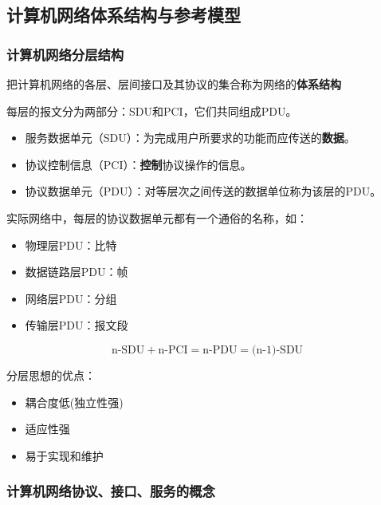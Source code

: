 \documentclass[12pt, a4paper, oneside]{ctexart}
\begin{document}
\subsection{计算机网络体系结构与参考模型}

\subsubsection{计算机网络分层结构}

把计算机网络的各层、层间接口及其协议的集合称为网络的\textbf{体系结构}

每层的报文分为两部分：SDU和PCI，它们共同组成PDU。
\begin{itemize}
    \item 服务数据单元（SDU）：为完成用户所要求的功能而应传送的\textbf{数据}。
    \item 协议控制信息（PCI）：\textbf{控制}协议操作的信息。
    \item 协议数据单元（PDU）：对等层次之间传送的数据单位称为该层的PDU。
\end{itemize}
实际网络中，每层的协议数据单元都有一个通俗的名称，如：
\begin{itemize}
    \item 物理层PDU：比特
    \item 数据链路层PDU：帧
    \item 网络层PDU：分组
    \item 传输层PDU：报文段
\end{itemize}
\begin{equation*}
    \text{n-SDU}+\text{n-PCI}=\text{n-PDU}=\text{(n-1)-SDU}
\end{equation*}

分层思想的优点：
\begin{itemize}
    \item 耦合度低(独立性强)
    \item 适应性强
    \item 易于实现和维护
\end{itemize}

\subsubsection{计算机网络协议、接口、服务的概念}
\end{document}
